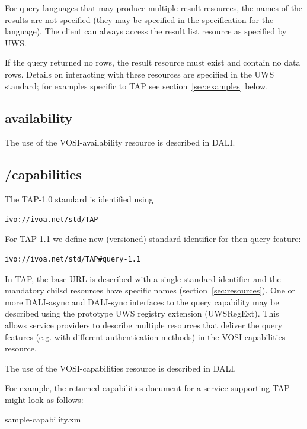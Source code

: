 \documentclass[11pt,letter]{ivoa}
\begin{document}
For query languages that may produce multiple result resources, the names of the 
results are not specified (they may be specified in the specification for the 
language). The client can always access the result list resource as specified by 
UWS.

If the query returned no rows, the result resource must exist and contain no 
data rows. Details on interacting with these resources are specified in the UWS 
standard; for examples specific to TAP see section~\ref{sec:examples} below.

\subsection{availability}
\label{sec:vosi-availability}

The use of the VOSI-availability resource is described in DALI.

\subsection{/capabilities}
\label{sec:vosi-capabilities}

The TAP-1.0 standard is identified using 
\begin{verbatim}
ivo://ivoa.net/std/TAP
\end{verbatim}

For TAP-1.1 we define new (versioned) standard identifier for then query feature: 

\begin{verbatim}
ivo://ivoa.net/std/TAP#query-1.1 
\end{verbatim}

In TAP, the base URL is described with a single standard identifier and the mandatory
chilsd resources have specific names (section~\ref{sec:resources}). One or more DALI-async 
and DALI-sync interfaces to the query capability may be described using the prototype UWS 
registry extension (UWSRegExt). This allows service 
providers to describe multiple resources that 
deliver the query features (e.g. with different authentication methods) in 
the VOSI-capabilities resource.

The use of the VOSI-capabilities resource is described in DALI.

For example, the returned capabilities document for a service supporting TAP 
might look as follows:


  {sample-capability.xml}
\end{document}
